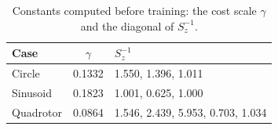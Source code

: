 \begin{table}[ht]
\centering\small
\caption{Constants computed before training: the cost scale $\gamma$ and the diagonal of $S_z^{-1}$.}
\label{tab:consts}
\begin{tabular}{@{}lcl@{}}
\toprule
Case & $\gamma$ & $S_z^{-1}$\\
\midrule
Circle & 0.1332 & 1.550, 1.396, 1.011\\
Sinusoid & 0.1823 & 1.001, 0.625, 1.000\\
Quadrotor & 0.0864 & 1.546, 2.439, 5.953, 0.703, 1.034\\
\bottomrule
\end{tabular}
\end{table}
